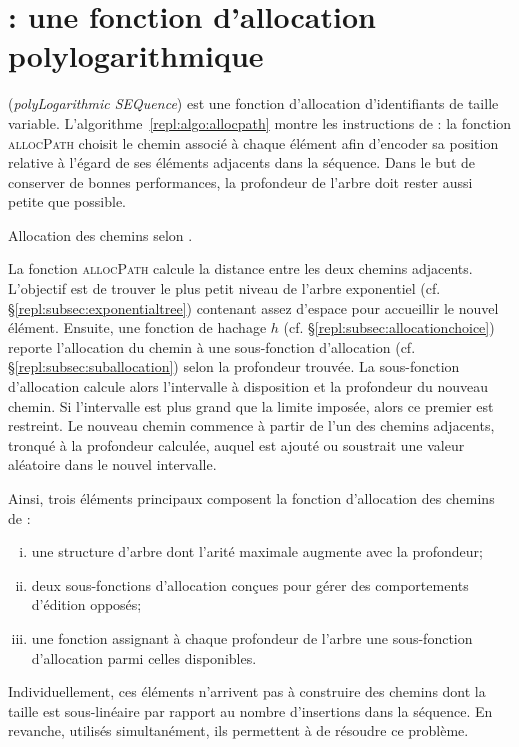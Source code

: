 
\section{\LSEQ : une fonction d'allocation polylogarithmique}
\label{repl:sec:proposal}

\LSEQ (\emph{polyLogarithmic SEQuence}) est une fonction d'allocation
d'identifiants de taille variable. L'algorithme~\ref{repl:algo:allocpath} montre
les instructions de \LSEQ : la fonction \textsc{allocPath} choisit le chemin
associé à chaque élément afin d'encoder sa position relative à l'égard de ses
éléments adjacents dans la séquence. Dans le but de conserver de bonnes
performances, la profondeur de l'arbre doit rester aussi petite que possible.

\begin{algorithm}
  
  \caption[Allocation des chemins selon \LSEQ]
  {\label{repl:algo:allocpath}Allocation des chemins selon \LSEQ.}
\end{algorithm}

La fonction \textsc{allocPath} calcule la distance entre les deux chemins
adjacents. L'objectif est de trouver le plus petit niveau de l'arbre exponentiel
(cf. §\ref{repl:subsec:exponentialtree}) contenant assez d'espace pour
accueillir le nouvel élément.  Ensuite, une fonction de hachage $h$
(cf. §\ref{repl:subsec:allocationchoice}) reporte l'allocation du chemin à une
sous-fonction d'allocation (cf. §\ref{repl:subsec:suballocation}) selon la
profondeur trouvée.  La sous-fonction d'allocation calcule alors l'intervalle à
disposition et la profondeur du nouveau chemin. Si l'intervalle est plus grand
que la limite imposée, alors ce premier est restreint. Le nouveau chemin
commence à partir de l'un des chemins adjacents, tronqué à la profondeur
calculée, auquel est ajouté ou soustrait une valeur aléatoire dans le nouvel
intervalle.


\noindent Ainsi, trois éléments principaux composent la fonction d'allocation
des chemins de \LSEQ :
\begin{enumerate}[(i)]
\item une structure d'arbre dont l'arité maximale augmente avec la
  profondeur;
\item deux sous-fonctions d'allocation conçues pour gérer des comportements
  d'édition opposés;
\item une fonction assignant à chaque profondeur de l'arbre une sous-fonction
  d'allocation parmi celles disponibles.
\end{enumerate}
Individuellement, ces éléments n'arrivent pas à construire des chemins dont la
taille est sous-linéaire par rapport au nombre d'insertions dans la
séquence. En revanche, utilisés simultanément, ils permettent à \LSEQ de
résoudre ce problème.

